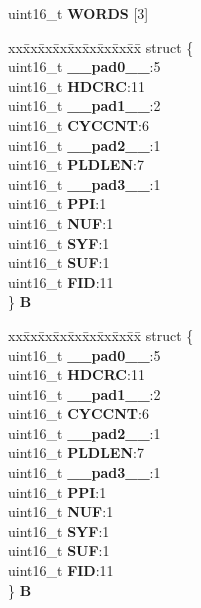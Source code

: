 \begin{DoxyCompactItemize}
\begin{tabbing}
\end{tabbing}\item 
\mbox{\label{unionuF__HEADER_a25c1a8e25f3a65b8c869c10615a142ac}} 
uint16\+\_\+t {\bfseries W\+O\+R\+DS} \mbox{[}3\mbox{]}
\item 
\mbox{\label{unionuF__HEADER_a9946e0bd3175d2d65ceff2c4ada214b2}} 
\begin{tabbing}
xx\=xx\=xx\=xx\=xx\=xx\=xx\=xx\=xx\=\kill
struct \{\\
\>uint16\_t {\bfseries \_\_pad0\_\_}:5\\
\>uint16\_t {\bfseries HDCRC}:11\\
\>uint16\_t {\bfseries \_\_pad1\_\_}:2\\
\>uint16\_t {\bfseries CYCCNT}:6\\
\>uint16\_t {\bfseries \_\_pad2\_\_}:1\\
\>uint16\_t {\bfseries PLDLEN}:7\\
\>uint16\_t {\bfseries \_\_pad3\_\_}:1\\
\>uint16\_t {\bfseries PPI}:1\\
\>uint16\_t {\bfseries NUF}:1\\
\>uint16\_t {\bfseries SYF}:1\\
\>uint16\_t {\bfseries SUF}:1\\
\>uint16\_t {\bfseries FID}:11\\
\} {\bfseries B}\\

\end{tabbing}\item 
\mbox{\label{unionuF__HEADER_a456f8e25e193c5e7b6be2991a45aba95}} 
\begin{tabbing}
xx\=xx\=xx\=xx\=xx\=xx\=xx\=xx\=xx\=\kill
struct \{\\
\>uint16\_t {\bfseries \_\_pad0\_\_}:5\\
\>uint16\_t {\bfseries HDCRC}:11\\
\>uint16\_t {\bfseries \_\_pad1\_\_}:2\\
\>uint16\_t {\bfseries CYCCNT}:6\\
\>uint16\_t {\bfseries \_\_pad2\_\_}:1\\
\>uint16\_t {\bfseries PLDLEN}:7\\
\>uint16\_t {\bfseries \_\_pad3\_\_}:1\\
\>uint16\_t {\bfseries PPI}:1\\
\>uint16\_t {\bfseries NUF}:1\\
\>uint16\_t {\bfseries SYF}:1\\
\>uint16\_t {\bfseries SUF}:1\\
\>uint16\_t {\bfseries FID}:11\\
\} {\bfseries B}\\


\end{tabbing}
\end{DoxyCompactItemize}
